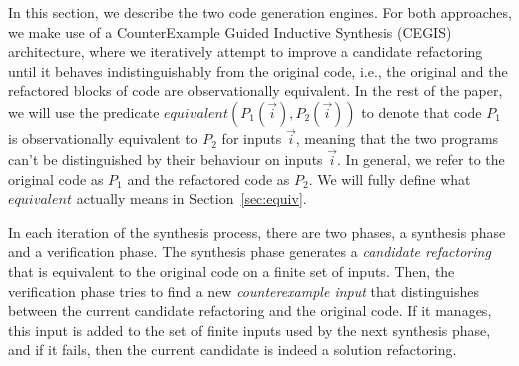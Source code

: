 \documentclass[sigconf,review,anonymous]{acmart}
\begin{document}



In this section, we describe the two code generation engines.
For both approaches, we make use of a CounterExample Guided Inductive Synthesis (CEGIS)~\cite{DBLP:conf/pldi/Solar-LezamaJB08} architecture, where we
iteratively attempt to improve a candidate refactoring
until it behaves indistinguishably
from the original code, i.e., the original and
the refactored blocks of code are observationally equivalent.
%
In the rest of the paper, we will use the predicate
$equivalent(P_1(\vec{i}), P_2(\vec{i}))$ to denote that code $P_1$ is
observationally equivalent to $P_2$ for inputs $\vec{i}$, meaning that the two programs
can't be distinguished by their behaviour on inputs $\vec{i}$.  In general,
we refer to the original code as $P_1$ and the refactored code as
$P_2$. We will fully define what $equivalent$ actually means in Section~\ref{sec:equiv}.

In each iteration of the synthesis process, there are two phases, a synthesis phase and a verification phase. The synthesis phase generates a {\em candidate refactoring} that is equivalent to
the original code on a finite set of inputs. Then, the verification phase tries to find a new {\em counterexample input} that distinguishes between the current candidate refactoring and the original code. If it manages, this input is added to the set of finite inputs used by the next synthesis phase, and if it fails, then the current candidate is indeed a solution refactoring.
\end{document}

